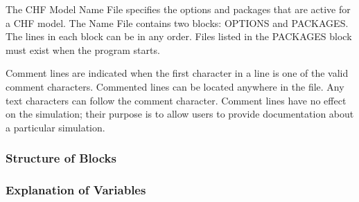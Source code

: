 The CHF Model Name File specifies the options and packages that are active for a CHF model.  The Name File contains two blocks: OPTIONS  and PACKAGES. The lines in each block can be in any order.  Files listed in the PACKAGES block must exist when the program starts. 

Comment lines are indicated when the first character in a line is one of the valid comment characters.  Commented lines can be located anywhere in the file. Any text characters can follow the comment character. Comment lines have no effect on the simulation; their purpose is to allow users to provide documentation about a particular simulation. 

\vspace{5mm}
\subsubsection{Structure of Blocks}



\vspace{5mm}
\subsubsection{Explanation of Variables}
\begin{description}

\end{description}

